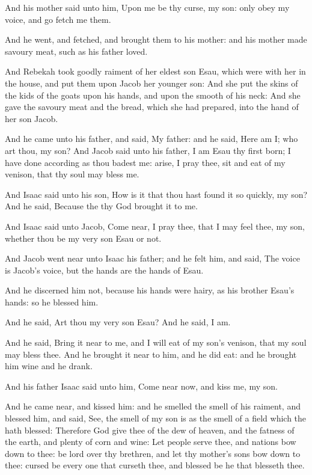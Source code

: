\verse And his mother said unto him, Upon me be thy curse, my son: only obey my voice, and go fetch me them.

\verse And he went, and fetched, and brought them to his mother: and his mother made savoury meat, such as his father loved.

\verse And Rebekah took goodly raiment of her eldest son Esau, which were with her in the house, and put them upon Jacob her younger son: \verse And she put the skins of the kids of the goats upon his hands, and upon the smooth of his neck: \verse And she gave the savoury meat and the bread, which she had prepared, into the hand of her son Jacob.

\verse And he came unto his father, and said, My father: and he said, Here am I; who art thou, my son?  \verse And Jacob said unto his father, I am Esau thy first born; I have done according as thou badest me: arise, I pray thee, sit and eat of my venison, that thy soul may bless me.

\verse And Isaac said unto his son, How is it that thou hast found it so quickly, my son? And he said, Because the \LORD thy God brought it to me.

\verse And Isaac said unto Jacob, Come near, I pray thee, that I may feel thee, my son, whether thou be my very son Esau or not.

\verse And Jacob went near unto Isaac his father; and he felt him, and said, The voice is Jacob's voice, but the hands are the hands of Esau.

\verse And he discerned him not, because his hands were hairy, as his brother Esau's hands: so he blessed him.

\verse And he said, Art thou my very son Esau? And he said, I am.

\verse And he said, Bring it near to me, and I will eat of my son's venison, that my soul may bless thee. And he brought it near to him, and he did eat: and he brought him wine and he drank.

\verse And his father Isaac said unto him, Come near now, and kiss me, my son.

\verse And he came near, and kissed him: and he smelled the smell of his raiment, and blessed him, and said, See, the smell of my son is as the smell of a field which the \LORD hath blessed: \verse Therefore God give thee of the dew of heaven, and the fatness of the earth, and plenty of corn and wine: \verse Let people serve thee, and nations bow down to thee: be lord over thy brethren, and let thy mother's sons bow down to thee: cursed be every one that curseth thee, and blessed be he that blesseth thee.

